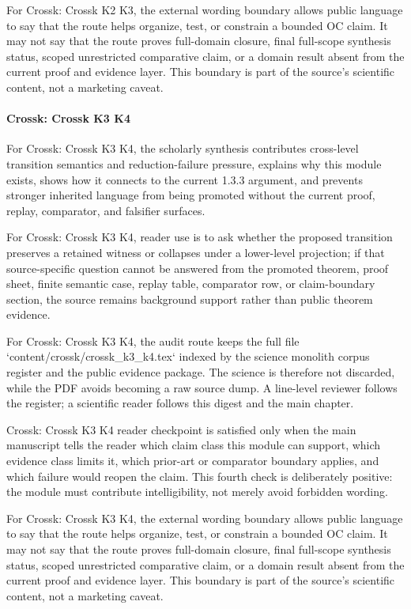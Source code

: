 For Crossk: Crossk K2 K3, the external wording boundary allows public language to say that the route helps organize, test, or constrain a bounded OC claim. It may not say that the route proves full-domain closure, final full-scope synthesis status, scoped unrestricted comparative claim, or a domain result absent from the current proof and evidence layer. This boundary is part of the source's scientific content, not a marketing caveat.


\paragraph{Crossk: Crossk K3 K4}

For Crossk: Crossk K3 K4, the scholarly synthesis contributes cross-level transition semantics and reduction-failure pressure, explains why this module exists, shows how it connects to the current 1.3.3 argument, and prevents stronger inherited language from being promoted without the current proof, replay, comparator, and falsifier surfaces.


For Crossk: Crossk K3 K4, reader use is to ask whether the proposed transition preserves a retained witness or collapses under a lower-level projection; if that source-specific question cannot be answered from the promoted theorem, proof sheet, finite semantic case, replay table, comparator row, or claim-boundary section, the source remains background support rather than public theorem evidence.


For Crossk: Crossk K3 K4, the audit route keeps the full file `content/crossk/crossk\_k3\_k4.tex` indexed by the science monolith corpus register and the public evidence package. The science is therefore not discarded, while the PDF avoids becoming a raw source dump. A line-level reviewer follows the register; a scientific reader follows this digest and the main chapter.


Crossk: Crossk K3 K4 reader checkpoint is satisfied only when the main manuscript tells the reader which claim class this module can support, which evidence class limits it, which prior-art or comparator boundary applies, and which failure would reopen the claim. This fourth check is deliberately positive: the module must contribute intelligibility, not merely avoid forbidden wording.


For Crossk: Crossk K3 K4, the external wording boundary allows public language to say that the route helps organize, test, or constrain a bounded OC claim. It may not say that the route proves full-domain closure, final full-scope synthesis status, scoped unrestricted comparative claim, or a domain result absent from the current proof and evidence layer. This boundary is part of the source's scientific content, not a marketing caveat.


